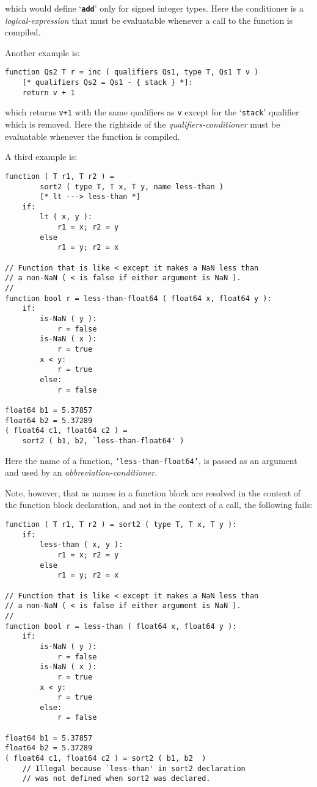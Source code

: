 \documentclass[12pt]{article}
\newcommand{\TT}[1]{{\tt \bfseries #1}}
\newenvironment{indpar}[1][0.3in]%
	{\begin{list}{}%
		     {\setlength{\itemsep}{0in}%
		      \setlength{\topsep}{0in}%
		      \setlength{\parsep}{1ex}%
		      \setlength{\labelwidth}{#1}%
		      \setlength{\leftmargin}{#1}%
		      \addtolength{\leftmargin}{\labelsep}}%
	 \item}%
	{\end{list}}
\begin{document}
which would define `\TT{add}' only for signed integer types.
Here the conditioner is a {\em logical-ex\-pres\-sion} that must
be evaluatable whenever a call to the function is compiled.

Another example is:
\begin{indpar}\begin{verbatim}
function Qs2 T r = inc ( qualifiers Qs1, type T, Qs1 T v )
    [* qualifiers Qs2 = Qs1 - { stack } *]:
    return v + 1
\end{verbatim}\end{indpar}

which returns {\tt v+1} with the same qualifiers as {\tt v}
except for the `{\tt stack}' qualifier which is removed.
Here the rightside of the {\em qualifiers-conditioner}
must be evaluatable whenever the function is compiled.

A third example is:
\begin{indpar}\begin{verbatim}
function ( T r1, T r2 ) =
        sort2 ( type T, T x, T y, name less-than )
        [* lt ---> less-than *]
    if:
        lt ( x, y ):
            r1 = x; r2 = y
        else
            r1 = y; r2 = x

// Function that is like < except it makes a NaN less than
// a non-NaN ( < is false if either argument is NaN ).
//
function bool r = less-than-float64 ( float64 x, float64 y ):
    if:
        is-NaN ( y ):
            r = false
        is-NaN ( x ):
            r = true
        x < y:
            r = true
        else:
            r = false

float64 b1 = 5.37857
float64 b2 = 5.37289
( float64 c1, float64 c2 ) =
    sort2 ( b1, b2, `less-than-float64' )
\end{verbatim}\end{indpar}

Here the name of a function, {\tt `less-than-float64'}, is
passed as an argument and used by an {\em abbreviation-conditioner}.

Note, however, that as names in a function block are resolved in the context
of the function block declaration, and not in the context of a
call, the following fails:
\begin{indpar}\begin{verbatim}
function ( T r1, T r2 ) = sort2 ( type T, T x, T y ):
    if:
        less-than ( x, y ):
            r1 = x; r2 = y
        else
            r1 = y; r2 = x

// Function that is like < except it makes a NaN less than
// a non-NaN ( < is false if either argument is NaN ).
//
function bool r = less-than ( float64 x, float64 y ):
    if:
        is-NaN ( y ):
            r = false
        is-NaN ( x ):
            r = true
        x < y:
            r = true
        else:
            r = false

float64 b1 = 5.37857
float64 b2 = 5.37289
( float64 c1, float64 c2 ) = sort2 ( b1, b2  )
    // Illegal because `less-than' in sort2 declaration
    // was not defined when sort2 was declared.
\end{verbatim}\end{indpar}
\end{document}
